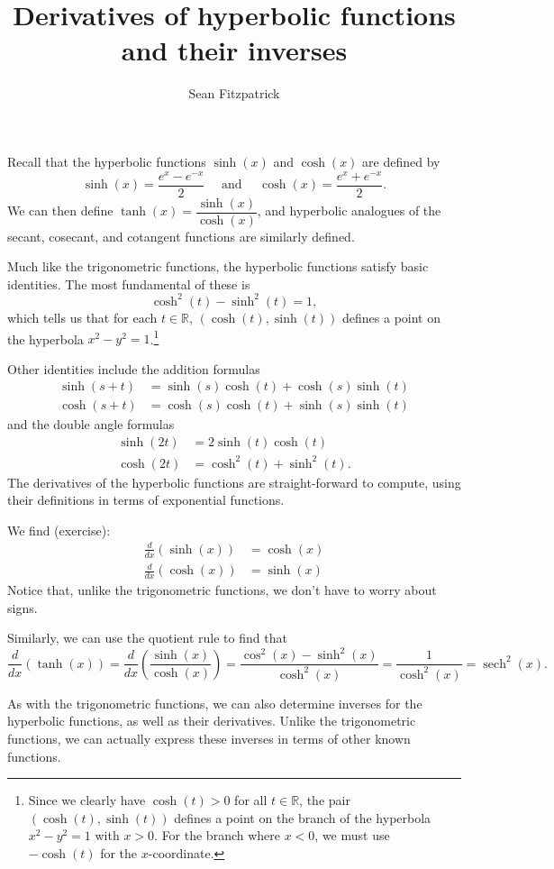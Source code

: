 \documentclass[12pt,letterpaper]{article}
\title{Derivatives of hyperbolic functions and their inverses}
\author{Sean Fitzpatrick}
\newcommand{\R}{\mathbb{R}}
\begin{document}
\maketitle

Recall that the hyperbolic functions $\sinh(x)$ and $\cosh(x)$ are defined by
\[
\sinh(x) = \frac{e^x-e^{-x}}{2} \quad \text{ and } \quad \cosh(x) = \frac{e^x+e^{-x}}{2}.
\]
We can then define $\tanh(x) = \dfrac{\sinh(x)}{\cosh(x)}$, and hyperbolic analogues of the secant, cosecant, and cotangent functions are similarly defined.

Much like the trigonometric functions, the hyperbolic functions satisfy basic identities. The most fundamental of these is
\[
\cosh^2(t)-\sinh^2(t) = 1,
\]
which tells us that for each $t\in \R$, $(\cosh(t),\sinh(t))$ defines a point on the hyperbola $x^2-y^2=1$.\footnote{Since we clearly have $\cosh(t)>0$ for all $t\in\R$, the pair $(\cosh(t),\sinh(t))$ defines a point on the branch of the hyperbola $x^2-y^2=1$ with $x>0$. For the branch where $x<0$, we must use $-\cosh(t)$ for the $x$-coordinate.}

Other identities include the addition formulas
\begin{align*}
\sinh(s+t) &= \sinh(s)\cosh(t)+\cosh(s)\sinh(t)\\
\cosh(s+t) &= \cosh(s)\cosh(t)+\sinh(s)\sinh(t)
\end{align*}
and the double angle formulas
\begin{align*}
\sinh(2t) & = 2\sinh(t)\cosh(t)\\
\cosh(2t) & = \cosh^2(t)+\sinh^2(t).
\end{align*}
The derivatives of the hyperbolic functions are straight-forward to compute, using their definitions in terms of exponential functions.

We find (exercise):
\begin{align*}
\frac{d}{dx}(\sinh(x)) & = \cosh(x)\\
\frac{d}{dx}(\cosh(x)) & = \sinh(x)
\end{align*}
Notice that, unlike the trigonometric functions, we don't have to worry about signs.

Similarly, we can use the quotient rule to find that
\[
\frac{d}{dx}(\tanh(x)) = \frac{d}{dx}\left(\frac{\sinh(x)}{\cosh(x)}\right) = \frac{\cos^2(x)-\sinh^2(x)}{\cosh^2(x)} = \frac{1}{\cosh^2(x)} = \operatorname{sech}^2(x).
\]

As with the trigonometric functions, we can also determine inverses for the hyperbolic functions, as well as their derivatives. Unlike the trigonometric functions, we can actually express these inverses in terms of other known functions.
\end{document}
